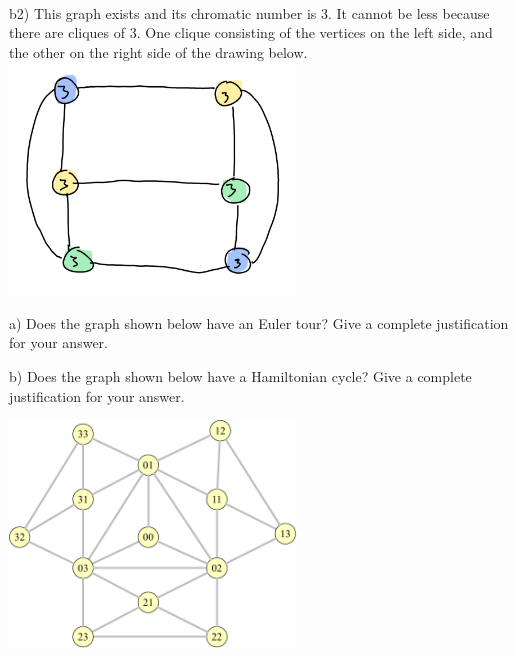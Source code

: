 \documentclass{article}
\begin{document}
\begin{solution}
	\\
	b2) This graph exists and its chromatic number is 3. It cannot be less because there are cliques of 3. One clique consisting of the vertices on the left side, and the other on the right side of the drawing below.
	\\ \includegraphics[width=3in]{b2.png}

\end{solution}

\vspace{0.15in}
\newpage
\begin{problem}

a) Does the graph shown below have an Euler tour? Give a complete justification for your answer.

b) Does the graph shown below have a Hamiltonian cycle? Give a complete justification for your answer.


	\begin{center}
	\includegraphics[width = 3in]{Ham_graph.pdf}
	\end{center}

\end{problem}
\end{document}
